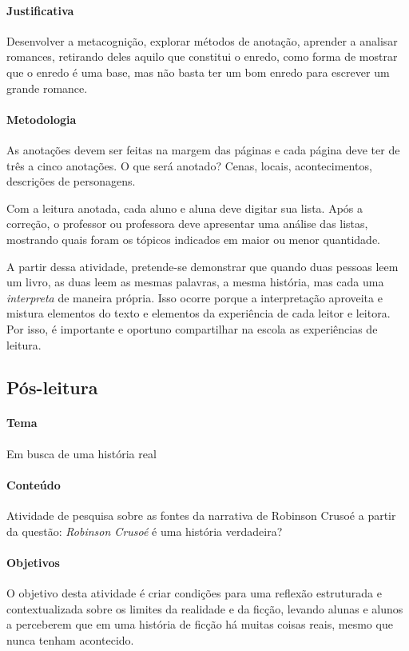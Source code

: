 \documentclass[12pt]{extarticle}
\begin{document}
\paragraph{Justificativa}
Desenvolver a metacognição, explorar métodos de anotação, aprender a
analisar romances, retirando deles aquilo que constitui o enredo, como
forma de mostrar que o enredo é uma base, mas não basta ter um bom
enredo para escrever um grande romance.

\paragraph{Metodologia}
As anotações devem ser feitas na margem das páginas e cada página deve
ter de três a cinco anotações. O que será anotado? Cenas, locais,
acontecimentos, descrições de personagens.

Com a leitura anotada, cada aluno e aluna deve digitar sua lista. Após a correção, o professor ou professora deve apresentar uma análise
das listas, mostrando quais foram os tópicos indicados em maior ou menor quantidade.

A partir dessa atividade, pretende-se demonstrar que quando duas pessoas leem
um livro, as duas leem as mesmas palavras, a mesma
história, mas cada uma \emph{interpreta} de maneira própria. Isso ocorre
porque a interpretação aproveita e mistura elementos do texto e
elementos da experiência de cada leitor e leitora. Por isso, é importante e oportuno compartilhar na escola as experiências
de leitura.

\subsection{Pós-leitura}

\paragraph{Tema} Em busca de uma história real


\paragraph{Conteúdo} Atividade de pesquisa sobre as fontes da narrativa de Robinson Crusoé a partir da questão: \emph{Robinson Crusoé} é uma história verdadeira?

\paragraph{Objetivos}
O objetivo desta atividade é criar condições para uma reflexão
estruturada e contextualizada sobre os limites da realidade e da ficção,
levando alunas e alunos a perceberem que em uma história de ficção há
muitas coisas reais, mesmo que nunca tenham acontecido.
\end{document}
